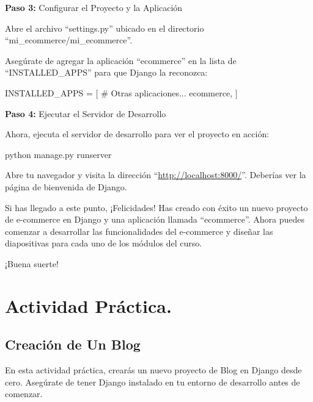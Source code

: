 \documentclass[
  letterpaper,
  DIV=11,
  numbers=noendperiod]{scrartcl}
\newenvironment{Shaded}{\begin{snugshade}}{\end{snugshade}}
\newcommand{\CommentTok}[1]{\textcolor[rgb]{0.37,0.37,0.37}{#1}}
\newcommand{\ExtensionTok}[1]{\textcolor[rgb]{0.00,0.23,0.31}{#1}}
\newcommand{\NormalTok}[1]{\textcolor[rgb]{0.00,0.23,0.31}{#1}}
\newcommand{\OperatorTok}[1]{\textcolor[rgb]{0.37,0.37,0.37}{#1}}
\newcommand{\StringTok}[1]{\textcolor[rgb]{0.13,0.47,0.30}{#1}}
\begin{document}
\textbf{Paso 3:} Configurar el Proyecto y la Aplicación

Abre el archivo ``settings.py'' ubicado en el directorio
``mi\_ecommerce/mi\_ecommerce''.

Asegúrate de agregar la aplicación ``ecommerce'' en la lista de
``INSTALLED\_APPS'' para que Django la reconozca:

\begin{Shaded}
\begin{Highlighting}[]
\NormalTok{INSTALLED\_APPS }\OperatorTok{=}\NormalTok{ [}
    \CommentTok{\# Otras aplicaciones...}
    \StringTok{\textquotesingle{}ecommerce\textquotesingle{}}\NormalTok{,}
\NormalTok{]}
\end{Highlighting}
\end{Shaded}

\textbf{Paso 4:} Ejecutar el Servidor de Desarrollo

Ahora, ejecuta el servidor de desarrollo para ver el proyecto en acción:

\begin{Shaded}
\begin{Highlighting}[]
\ExtensionTok{python}\NormalTok{ manage.py runserver}
\end{Highlighting}
\end{Shaded}

Abre tu navegador y visita la dirección
``\url{http://localhost:8000/}''. Deberías ver la página de bienvenida
de Django.

Si has llegado a este punto, ¡Felicidades! Has creado con éxito un nuevo
proyecto de e-commerce en Django y una aplicación llamada ``ecommerce''.
Ahora puedes comenzar a desarrollar las funcionalidades del e-commerce y
diseñar las diapositivas para cada uno de los módulos del curso.

¡Buena suerte!

\hypertarget{actividad-pruxe1ctica.}{%
\section{Actividad Práctica.}\label{actividad-pruxe1ctica.}}

\hypertarget{creaciuxf3n-de-un-blog}{%
\subsection{Creación de Un Blog}\label{creaciuxf3n-de-un-blog}}

En esta actividad práctica, crearás un nuevo proyecto de Blog en Django
desde cero. Asegúrate de tener Django instalado en tu entorno de
desarrollo antes de comenzar.
\end{document}
